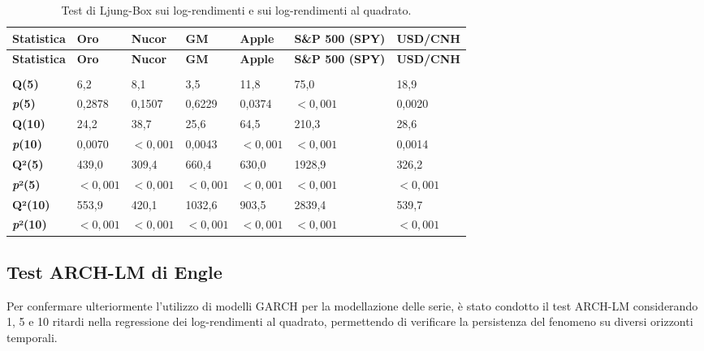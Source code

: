 {
\small
\begin{longtable}{ p{} p{} p{} p{} p{} p{} p{} }
\toprule
\textbf{Statistica} & \textbf{Oro} & \textbf{Nucor} & \textbf{GM} & \textbf{Apple} & \textbf{S\&P 500 (SPY)} & \textbf{USD/\newline CNH} \\
\midrule
\endfirsthead

\toprule
\textbf{Statistica} & \textbf{Oro} & \textbf{Nucor} & \textbf{GM} & \textbf{Apple} & \textbf{S\&P 500 (SPY)} & \textbf{USD/\newline CNH} \\
\midrule
\endhead

\midrule
\noalign{\vspace{10pt}}
\caption[]{Test di Ljung-Box.} \\
\endfoot

\bottomrule
\noalign{\vspace{10pt}}
\caption{Test di Ljung-Box sui log-rendimenti e sui log-rendimenti al quadrato.}
\label{tab:ljung-box}
\endlastfoot

\textbf{Q(5)} & 6,2 & 8,1 & 3,5 & 11,8 & 75,0 & 18,9 \\ \midrule
\textbf{\emph{p}(5)} & 0,2878 & 0,1507 & 0,6229 & 0,0374 & $< 0,001$ & 0,0020 \\ \midrule
\textbf{Q(10)} & 24,2 & 38,7 & 25,6 & 64,5 & 210,3 & 28,6 \\ \midrule
\textbf{\emph{p}(10)} & 0,0070 & $< 0,001$ & 0,0043 & $< 0,001$ & $< 0,001$ & 0,0014 \\ \midrule
\textbf{Q²(5)} & 439,0 & 309,4 & 660,4 & 630,0 & 1928,9 & 326,2 \\ \midrule
\textbf{\emph{p}²(5)} & $< 0,001$ & $< 0,001$ & $< 0,001$ & $< 0,001$ & $< 0,001$ & $< 0,001$ \\ \midrule
\textbf{Q²(10)} & 553,9 & 420,1 & 1032,6 & 903,5 & 2839,4 & 539,7 \\ \midrule
\textbf{\emph{p}²(10)} & $< 0,001$ & $< 0,001$ & $< 0,001$ & $< 0,001$ & $< 0,001$ & $< 0,001$ \\
\end{longtable}
}

\subsection{Test ARCH-LM di Engle}
Per confermare ulteriormente l'utilizzo di modelli GARCH per la modellazione delle serie, è stato condotto il test ARCH-LM considerando 1, 5 e 10 ritardi nella 
regressione dei log-rendimenti al quadrato, permettendo di verificare la persistenza del fenomeno su diversi orizzonti temporali. 

